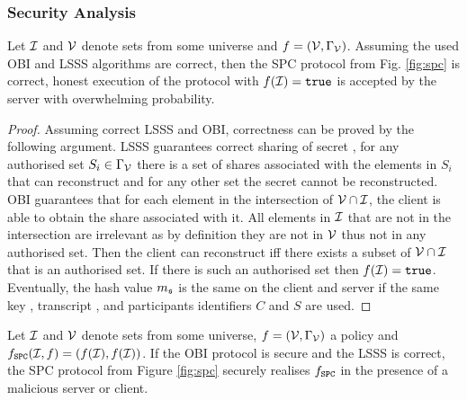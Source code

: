 \subsubsection{Security Analysis}
\begin{lemma}[Correctness]\label{lem:correct}
  Let $\mathcal{I}$ and $\mathcal{V}$ denote sets from some universe and $f=(\mathcal{V},\Gamma_\mathcal{V})$.
  Assuming the used \ac{OBI} and \ac{LSSS} algorithms are correct, then the \ac{SPC} protocol from Fig. \ref{fig:spc} is correct, \ie honest execution of the protocol with $f(\mathcal{I}) = \mathtt{true}$ is accepted by the server with overwhelming probability.\end{lemma}
\begin{proof}
Assuming correct \ac{LSSS} and \ac{OBI}, correctness can be proved by the following argument.
LSSS guarantees correct sharing of secret \secret, \ie for any authorised set $S_i\in \Gamma_\mathcal{V}$ there is a set of shares associated with the elements in $S_i$ that can reconstruct \secret and for any other set the secret cannot be reconstructed. 
OBI guarantees that for each element in the intersection of $\mathcal{V}\cap \mathcal{I}$, the client is able to obtain the share associated with it. 
All elements in $\mathcal{I}$ that are not in the intersection are irrelevant as by definition they are not in $\mathcal{V}$ thus not in any authorised set. 
Then the client can reconstruct \secret iff there exists a subset of $\mathcal{V}\cap \mathcal{I}$ that is an authorised set. 
If there is such an authorised set then $f(\mathcal{I})=\mathtt{true}$. Eventually, the hash value $m_\mathfrak{s}$ is the same on the client and server if the same key \secret, transcript \trans, and participants identifiers $C$ and $S$ are used.
\end{proof}

\begin{lemma}[Privacy]\label{lem:SPCprivacy}
 Let $\mathcal{I}$ and $\mathcal{V}$ denote sets from some universe, $f=(\mathcal{V},\Gamma_\mathcal{V})$ a policy and $f_\mathtt{SPC}(\mathcal{I}, f)=(f(\mathcal{I}), f(\mathcal{I}))$. 
 If the \ac{OBI} protocol is secure and the \ac{LSSS} is correct, the \ac{SPC} protocol from Figure \ref{fig:spc} securely realises $f_\mathtt{SPC}$ in the presence of a malicious server or client.
\end{lemma}

